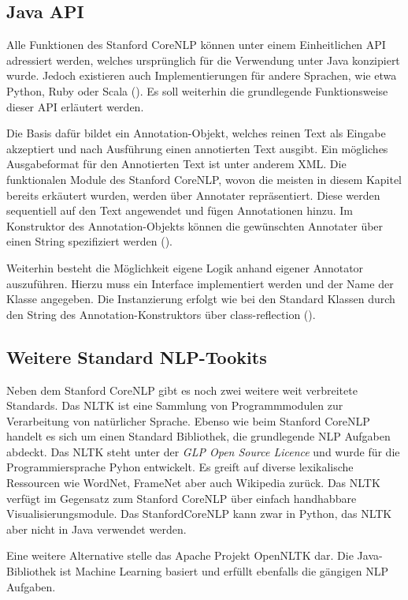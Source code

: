 \subsection{Java API}
\label{subsec:corenlpjava}
Alle Funktionen des Stanford CoreNLP können unter einem Einheitlichen \ac{API} adressiert werden, welches ursprünglich für die Verwendung unter Java konzipiert wurde. Jedoch existieren auch Implementierungen für andere Sprachen, wie etwa Python, Ruby oder Scala (\cite[vgl.][3]{STANFORDNLP}). Es soll weiterhin die grundlegende Funktionsweise dieser \ac{API} erläutert werden.\par
Die Basis dafür bildet ein Annotation-Objekt, welches reinen Text als Eingabe akzeptiert und nach Ausführung einen annotierten Text ausgibt. Ein mögliches Ausgabeformat für den Annotierten Text ist unter anderem XML. Die funktionalen Module des Stanford CoreNLP, wovon die meisten in diesem Kapitel bereits erkäutert wurden, werden über Annotater repräsentiert. Diese werden sequentiell auf den Text angewendet und fügen Annotationen hinzu. Im Konstruktor des Annotation-Objekts können die gewünschten Annotater über einen String spezifiziert werden (\cite[vgl.][1]{STANFORDNLP}).\par
Weiterhin besteht die Möglichkeit eigene Logik anhand eigener Annotator auszuführen. Hierzu muss ein Interface implementiert werden und der Name der Klasse angegeben. Die Instanzierung erfolgt wie bei den Standard Klassen durch den String des Annotation-Konstruktors über class-reflection (\cite[vgl.][4]{STANFORDNLP}).

\subsection{Weitere Standard NLP-Tookits}

Neben dem Stanford CoreNLP gibt es noch zwei weitere weit verbreitete Standards. Das \ac{NLTK} ist eine Sammlung von Programmmodulen zur Verarbeitung von natürlicher Sprache. Ebenso wie beim Stanford CoreNLP handelt es sich um einen Standard Bibliothek, die grundlegende \ac{NLP} Aufgaben abdeckt. Das \ac{NLTK} steht unter der \textit{GLP Open Source Licence} und wurde für die Programmiersprache Pyhon entwickelt. Es greift auf diverse lexikalische Ressourcen wie WordNet, FrameNet aber auch Wikipedia zurück. Das \ac{NLTK} verfügt im Gegensatz zum Stanford CoreNLP über einfach handhabbare Visualisierungsmodule. Das StanfordCoreNLP kann zwar in Python, das NLTK aber nicht in Java verwendet werden.
\par
Eine weitere Alternative stelle das Apache Projekt OpenNLTK dar. Die Java-Bibliothek ist Machine Learning basiert und erfüllt ebenfalls die gängigen NLP Aufgaben.

